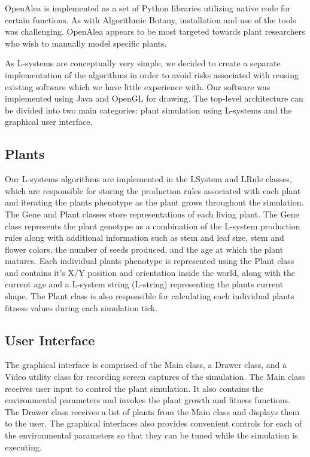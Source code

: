 \documentclass[conference]{acmsiggraph}
\begin{document}
OpenAlea is implemented as a set of Python libraries utilizing native code for
certain functions. As with Algorithmic Botany, installation and use of the tools
was challenging. OpenAlea appears to be most targeted towards plant researchers
who wish to manually model specific plants.

As L-systems are conceptually very simple, we decided to create a separate
implementation of the algorithms in order to avoid risks associated with reusing
existing software which we have little experience with. Our software was
implemented using Java and OpenGL for drawing. The top-level architecture can be
divided into two main categories: plant simulation using L-systems and the
graphical user interface.

\subsection{Plants}

Our L-systems algorithms are implemented in the LSystem and LRule classes, which
are responsible for storing the production rules associated with each plant and
iterating the plants phenotype as the plant grows throughout the simulation. The
Gene and Plant classes store representations of each living plant. The Gene
class represents the plant genotype as a combination of the L-system production
rules along with additional information such as stem and leaf size, stem and
flower colors, the number of seeds produced, and the age at which the plant
matures. Each individual plants phenotype is represented using the Plant class
and contains it's X/Y position and orientation inside the world, along with the
current age and a L-system string (L-string) representing the plants current
shape. The Plant class is also responsible for calculating each individual
plants fitness values during each simulation tick.

\subsection{User Interface}

The graphical interface is comprised of the Main class, a Drawer class, and a
Video utility class for recording screen captures of the simulation. The Main
class receives user input to control the plant simulation. It also contains the
environmental parameters and invokes the plant growth and fitness functions. The
Drawer class receives a list of plants from the Main class and displays them to
the user. The graphical interfaces also provides convenient controls for each of
the environmental parameters so that they can be tuned while the simulation is
executing.
\end{document}
